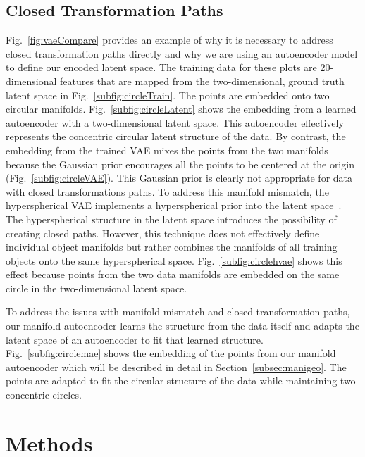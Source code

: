 \documentclass[letterpaper]{article} %
\begin{document}
\subsection{Closed Transformation Paths}

Fig.~\ref{fig:vaeCompare} provides an example of why it is necessary to address closed transformation paths directly and why we are using an autoencoder model to define our encoded latent space. The training data for these plots are 20-dimensional features that are mapped from the two-dimensional, ground truth latent space in Fig.~\ref{subfig:circleTrain}. The points are embedded onto two circular manifolds. Fig.~\ref{subfig:circleLatent} shows the embedding from a learned autoencoder with a two-dimensional latent space. This autoencoder effectively represents the concentric circular latent structure of the data. By contrast, the embedding from the trained VAE mixes the points from the two manifolds because the Gaussian prior encourages all the points to be centered at the origin (Fig.~\ref{subfig:circleVAE}). This Gaussian prior is clearly not appropriate for data with closed transformations paths. To address this manifold mismatch, the hyperspherical VAE implements a hyperspherical prior into the latent space~\cite{davidson2018hyperspherical}. The hyperspherical structure in the latent space introduces the possibility of creating closed paths. However, this technique does not effectively define individual object manifolds but rather combines the manifolds of all training objects onto the same hyperspherical space. Fig.~\ref{subfig:circlehvae} shows this effect because points from the two data manifolds are embedded on the same circle in the two-dimensional latent space. 

To address the issues with manifold mismatch and closed transformation paths, our manifold autoencoder learns the structure from the data itself and adapts the latent space of an autoencoder to fit that learned structure. Fig.~\ref{subfig:circlemae} shows the embedding of the points from our manifold autoencoder which will be described in detail in Section~\ref{subsec:manigeo}. The points are adapted to fit the circular structure of the data while maintaining two concentric circles.


\section{Methods}
\end{document}
